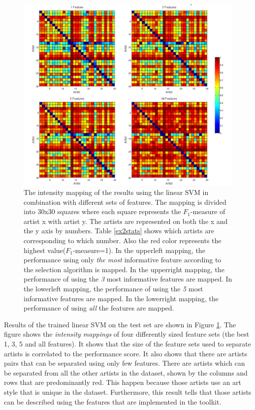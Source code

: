 \begin{figure}[htb]
  \centering
  \includegraphics[width=0.75\linewidth]{img/experiment2results.png}
  \caption{The intensity mapping of the results using the linear SVM in combination with different sets of features.
  The mapping is divided into 30x30 squares where each square represents the $F_1$-measure of artist x with artist y.
  The artists are represented on both the x and the y axis by numbers.
  Table \ref{ex2stats} shows which artists are corresponding to which number.
  Also the red color represents the highest value($F_1$-measure=1).
  In the upperleft mapping, the performance using only \textit{the most} informative feature according to the selection algorithm is mapped.
  In the upperright mapping, the performance of using the \textit{3} most informative features are mapped.
  In the lowerleft mapping, the performance of using the \textit{5} most informative features are mapped.
  In the lowerright mapping, the performance of using \textit{all} the features are mapped.
  }
  \label{fig:experiment2results}
\end{figure}

Results of the trained linear SVM on the test set are shown in Figure \ref{fig:experiment2results}.
The figure shows the \textit{intensity mappings} of four differently sized feature sets (the best 1, 3, 5 and all features).
It shows that the size of the feature sets used to separate artists is correlated to the performance score.
It also shows that there are artists pairs that can be separated using only few features.
There are artists which can be separated from all the other artists in the dataset, shown by the columns and rows that are predominantly red.
This happen because those artists use an art style that is unique in the dataset.
Furthermore, this result tells that those artists can be described using the features that are implemented in the toolkit.

